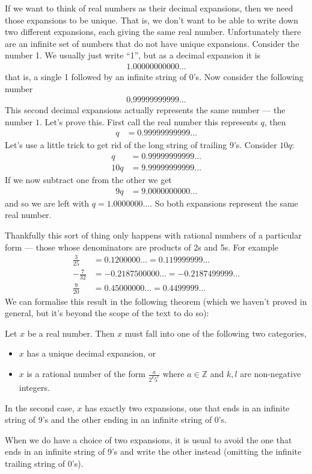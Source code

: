 If we want to think of real numbers as their decimal expansions, then we need
those expansions to be unique. That is, we don't want to be able to write down
two different expansions, each giving the same real number. Unfortunately there
are an infinite set of numbers that do not have unique expansions. Consider the
number 1. We usually just write ``1'', but as a decimal expansion it is
\begin{align*}
  1.00000000000\dots
\end{align*}
that is, a single 1 followed by an infinite string of 0's. Now consider the
following number
\begin{align*}
  0.99999999999\dots
\end{align*}
This second decimal expansions actually represents the same number ---
the number $1$. Let's prove this. First call the real number this
represents $q$, then
\begin{align*}
  q &=0.99999999999\dots
\end{align*}
Let's use a little trick to get rid of the long string of trailing 9's. Consider
$10q$:
\begin{align*}
  q &=0.99999999999\dots\\
  10q &=9.99999999999\dots
\end{align*}
If we now subtract one from the other we get
\begin{align*}
  9q &= 9.0000000000\dots
\end{align*}
and so we are left with $q=1.0000000\dots$. So both expansions represent the
same real number.

Thankfully this sort of thing only happens with rational numbers of a
particular form --- those whose denominators are products of 2s and 5s. For
example
\begin{align*}
  \frac{3}{25} &= 0.1200000\dots = 0.119999999\dots\\
  -\frac{7}{32} &= -0.2187500000\dots = -0.2187499999\dots\\
  \frac{9}{20} &= 0.45000000\dots = 0.4499999\dots
\end{align*}
We can formalise this result in the following theorem (which we haven't proved
in general, but it's beyond the scope of the text to do so):
\begin{theorem}\label{thm_0_1_1}
 Let $x$ be a real number. Then $x$ must fall into one of the following two
categories,
\begin{itemize}
 \item $x$ has a unique decimal expansion, or
 \item $x$ is a rational number of the form $\frac{a}{2^k 5^\ell}$ where $a\in
\mathbb{Z}$ and $k,l$ are non-negative integers.
\end{itemize}
In the second case, $x$ has exactly two expansions, one that ends in an
infinite string of 9's and the other ending in an infinite string of 0's.
\end{theorem}
When we do have a choice of two expansions, it is usual to avoid the one that
ends in an infinite string of 9's and write the other instead (omitting the
infinite trailing string of 0's).

